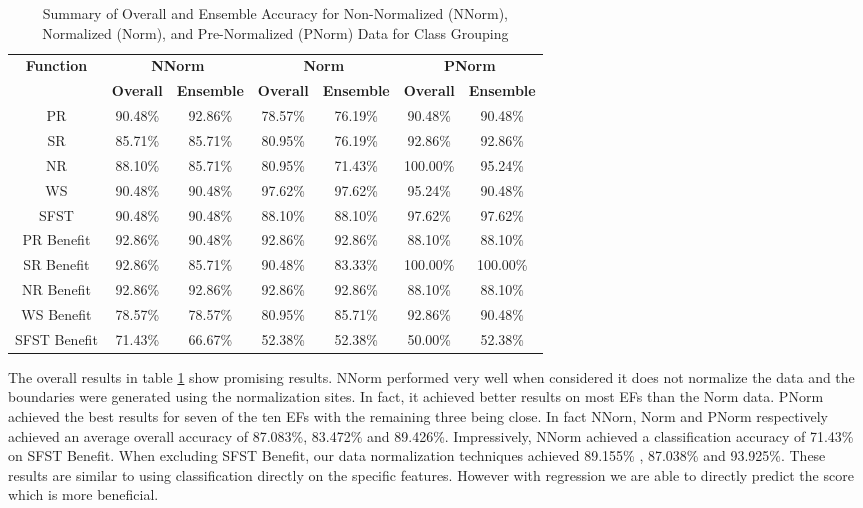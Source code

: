 \documentclass[12pt,letterpaper]{article}
\begin{document}
\begin{table}[H]
\centering
\begin{tabular}{|c||c|c||c|c||c|c|}
\hline
\multirow{2}{*}{\textbf{Function}} & \multicolumn{2}{c||}{\textbf{NNorm}} & \multicolumn{2}{c||}{\textbf{Norm}} & \multicolumn{2}{c|}{\textbf{PNorm}} \\
\cline{2-7}
 & \textbf{Overall} & \textbf{Ensemble} & \textbf{Overall} & \textbf{Ensemble} & \textbf{Overall} & \textbf{Ensemble} \\
\hline
PR & 90.48\% & 92.86\% & 78.57\% & 76.19\% & 90.48\% & 90.48\% \\
\hline
SR & 85.71\% & 85.71\% & 80.95\% & 76.19\% & 92.86\% & 92.86\% \\
\hline
NR & 88.10\% & 85.71\% & 80.95\% & 71.43\% & 100.00\% & 95.24\% \\
\hline
WS & 90.48\% & 90.48\% & 97.62\% & 97.62\% & 95.24\% & 90.48\% \\
\hline
SFST & 90.48\% & 90.48\% & 88.10\% & 88.10\% & 97.62\% & 97.62\% \\
\hline
PR Benefit & 92.86\% & 90.48\% & 92.86\% & 92.86\% & 88.10\% & 88.10\% \\
\hline
SR Benefit & 92.86\% & 85.71\% & 90.48\% & 83.33\% & 100.00\% & 100.00\% \\
\hline
NR Benefit & 92.86\% & 92.86\% & 92.86\% & 92.86\% & 88.10\% & 88.10\% \\
\hline
WS Benefit & 78.57\% & 78.57\% & 80.95\% & 85.71\% & 92.86\% & 90.48\% \\
\hline
SFST Benefit & 71.43\% & 66.67\% & 52.38\% & 52.38\% & 50.00\% & 52.38\% \\
\hline
\end{tabular}
\caption{Summary of Overall and Ensemble Accuracy for Non-Normalized (NNorm), Normalized (Norm), and Pre-Normalized (PNorm) Data for Class Grouping}

\label{reg_spec_tab:summary_class_grouping}
\end{table}

The overall results in table \ref{reg_spec_tab:summary_class_grouping} show promising results.
NNorm performed very well when considered it does not normalize the data and the boundaries were generated using the normalization sites.
In fact, it achieved better results on most \ac{EF}s than the Norm data.
PNorm achieved the best results for seven of the ten \ac{EF}s with the remaining three being close.
In fact NNorn, Norm and PNorm respectively achieved an average overall accuracy of 87.083\%, 83.472\% and 89.426\%.
Impressively, NNorm achieved a classification accuracy of 71.43\% on \ac{SFST} Benefit.
When excluding \ac{SFST} Benefit, our data normalization techniques achieved 89.155\% , 87.038\% and 93.925\%.
These results are similar to using classification directly on the specific features.
However with regression we are able to directly predict the score which is more beneficial.
\end{document}

